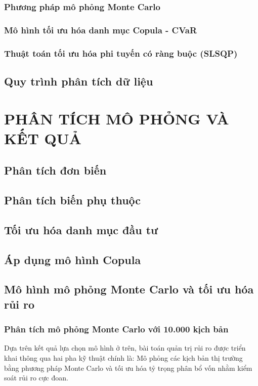 \documentclass[a4paper,12pt]{article}
\begin{document}
\subsubsection{Phương pháp mô phỏng Monte Carlo}

\subsubsection{Mô hình tối ưu hóa danh mục Copula - CVaR}

\subsubsection{Thuật toán tối ưu hóa phi tuyến có ràng buộc (SLSQP)}

\subsection{Quy trình phân tích dữ liệu}



\section{PHÂN TÍCH MÔ PHỎNG VÀ KẾT QUẢ}
\subsection{Phân tích đơn biến}

\subsection{Phân tích biến phụ thuộc}

\subsection{Tối ưu hóa danh mục đầu tư}

\subsection{Áp dụng mô hình Copula}

\subsection{Mô hình mô phỏng Monte Carlo và tối ưu hóa rủi ro}
\subsubsection{Phân tích mô phỏng Monte Carlo với 10.000 kịch bản}

Dựa trên kết quả lựa chọn mô hình ở trên, bài toán quản trị rủi ro được triển khai thông qua hai pha kỹ thuật chính là: Mô phỏng các kịch bản thị trường bằng phương pháp Monte Carlo và tối ưu hóa tỷ trọng phân bổ vốn nhằm kiểm soát rủi ro cực đoan.\\

\end{document}
